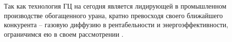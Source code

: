 Так как технология ГЦ на сегодня является лидирующей в промышленном производстве обогащенного урана, кратно превосходя своего ближайшего конкурента -- газовую диффузию в рентабельности и энергоэффективности, ограничимся ею в своем рассмотрении \cite{rothwellCostStructureInternational2008}.
